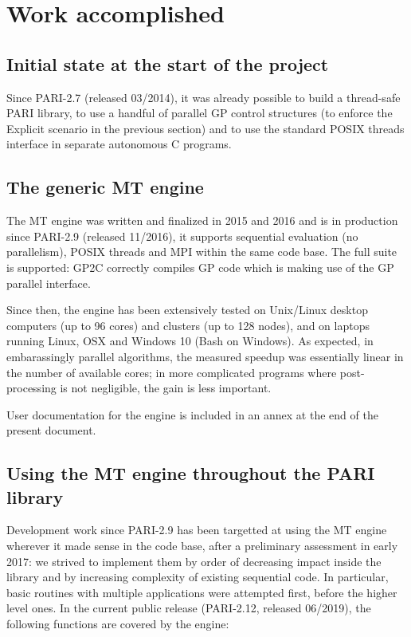 \documentclass{deliverablereport}
\begin{document}
\section{Work accomplished}
\subsection{Initial state at the start of the project}
Since PARI-2.7 (released 03/2014), it was already possible to build a
thread-safe PARI library, to use a handful of parallel GP control structures
(to enforce the Explicit scenario in the previous section) and to use the
standard POSIX threads interface in separate autonomous C programs.

\subsection{The generic MT engine}
The MT engine was written and finalized in 2015 and 2016 and is in
production since PARI-2.9 (released 11/2016), it supports sequential
evaluation (no parallelism), POSIX threads and MPI within the same code
base. The full suite is supported: GP2C correctly compiles GP code which is
making use of the GP parallel interface.

Since then, the engine has been extensively tested on Unix/Linux
desktop computers (up to 96 cores) and clusters (up to 128 nodes), and on
laptops running Linux, OSX and Windows 10 (Bash on Windows). As expected, in
embarassingly parallel algorithms, the measured speedup was essentially
linear in the number of available cores; in more complicated programs where
post-processing is not negligible, the gain is less important.

User documentation for the engine is included in an annex at the end of the
present document.

\subsection{Using the MT engine throughout the PARI library}
Development work since PARI-2.9 has been targetted at using the MT engine
wherever it made sense in the \Pari code base, after a preliminary assessment
in early 2017: we strived to implement them by order of decreasing impact
inside the \Pari library and by increasing complexity of existing sequential
code. In particular, basic routines with multiple applications were attempted
first, before the higher level ones. In the current public release
(PARI-2.12, released 06/2019), the following functions are covered by the
engine:
\end{document}
